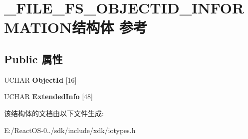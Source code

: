 \hypertarget{struct___f_i_l_e___f_s___o_b_j_e_c_t_i_d___i_n_f_o_r_m_a_t_i_o_n}{}\section{\+\_\+\+F\+I\+L\+E\+\_\+\+F\+S\+\_\+\+O\+B\+J\+E\+C\+T\+I\+D\+\_\+\+I\+N\+F\+O\+R\+M\+A\+T\+I\+O\+N结构体 参考}
\label{struct___f_i_l_e___f_s___o_b_j_e_c_t_i_d___i_n_f_o_r_m_a_t_i_o_n}
\subsection*{Public 属性}
\begin{DoxyCompactItemize}
\item 
\mbox{\label{struct___f_i_l_e___f_s___o_b_j_e_c_t_i_d___i_n_f_o_r_m_a_t_i_o_n_a4587c454765dd308229f15c624f51a23}} 
U\+C\+H\+AR {\bfseries Object\+Id} \mbox{[}16\mbox{]}
\item 
\mbox{\label{struct___f_i_l_e___f_s___o_b_j_e_c_t_i_d___i_n_f_o_r_m_a_t_i_o_n_a4262a80898c6d9d9edc5bdcf8b2341ec}} 
U\+C\+H\+AR {\bfseries Extended\+Info} \mbox{[}48\mbox{]}
\end{DoxyCompactItemize}


该结构体的文档由以下文件生成\+:\begin{DoxyCompactItemize}
\item 
E\+:/\+React\+O\+S-\/0../sdk/include/xdk/iotypes.\+h\end{DoxyCompactItemize}
